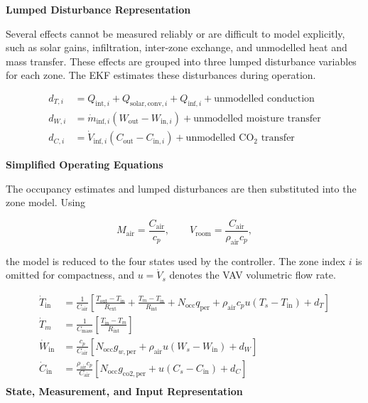 \documentclass[12pt, a4paper]{article}
\begin{document}
	
	\noindent\textbf{Lumped Disturbance Representation}
	
	Several effects cannot be measured reliably or are difficult to model
	explicitly, such as  solar gains, infiltration, inter-zone exchange, and
	unmodelled heat and mass transfer. These effects are grouped into three
	lumped disturbance variables for each zone. The EKF estimates these
	disturbances during operation.
	
	\begin{align}
		d_{T,i}
		&=
		Q_{\mathrm{int},i}
		+
		Q_{\mathrm{solar,conv},i}
		+
		Q_{\mathrm{inf},i}
		+
		\text{unmodelled conduction}
		\label{eq:dT}
		\\
		d_{W,i}
		&=
		\dot{m}_{\mathrm{inf},i}
		(W_{\mathrm{out}}-W_{\mathrm{in},i})
		+
		\text{unmodelled moisture transfer}
		\label{eq:dW}
		\\
		d_{C,i}
		&=
		\dot{V}_{\mathrm{inf},i}
		(C_{\mathrm{out}}-C_{\mathrm{in},i})
		+
		\text{unmodelled CO$_2$ transfer}
		\label{eq:dC}
	\end{align}
	
	
	\noindent\textbf{Simplified Operating Equations}
	
	The occupancy estimates and lumped disturbances are then substituted into
	the zone model. Using
	
	\begin{equation}
		M_{\mathrm{air}} = \frac{C_{\mathrm{air}}}{c_p},
		\qquad
		V_{\mathrm{room}}
		=
		\frac{C_{\mathrm{air}}}{\rho_{\mathrm{air}}c_p},
	\end{equation}
	
	the model is reduced to the four states used by the controller. The zone
	index $i$ is omitted for compactness, and $u=\dot{V}_s$ denotes the VAV
	volumetric flow rate.
	
	\begin{align}
		\dot{T}_{\mathrm{in}}
		&=
		\frac{1}{C_{\mathrm{air}}}
		\left[
		\frac{T_{\mathrm{out}}-T_{\mathrm{in}}}{R_{\mathrm{ext}}}
		+
		\frac{T_m-T_{\mathrm{in}}}{R_{\mathrm{int}}}
		+
		N_{\mathrm{occ}}q_{\mathrm{per}}
		+
		\rho_{\mathrm{air}}c_pu(T_s-T_{\mathrm{in}})
		+
		d_T
		\right]
		\label{eq:simplified_T}
		\\
		\dot{T}_m
		&=
		\frac{1}{C_{\mathrm{mass}}}
		\left[
		\frac{T_{\mathrm{in}}-T_m}{R_{\mathrm{int}}}\right]
		\label{eq:simplified_Tm}
		\\
		\dot{W}_{\mathrm{in}}
		&=
		\frac{c_p}{C_{\mathrm{air}}}
		\left[
		N_{\mathrm{occ}}g_{w,\mathrm{per}}
		+
		\rho_{\mathrm{air}}u(W_s-W_{\mathrm{in}})
		+
		d_W
		\right]
		\label{eq:simplified_W}
		\\
		\dot{C}_{\mathrm{in}}
		&=
		\frac{\rho_{\mathrm{air}}c_p}{C_{\mathrm{air}}}
		\left[
		N_{\mathrm{occ}}g_{\mathrm{co2,per}}
		+
		u(C_s-C_{\mathrm{in}})
		+
		d_C
		\right]
		\label{eq:simplified_C}\\
	\end{align}
	\newpage
	\noindent\textbf{State, Measurement, and Input Representation}
	
\end{document}
